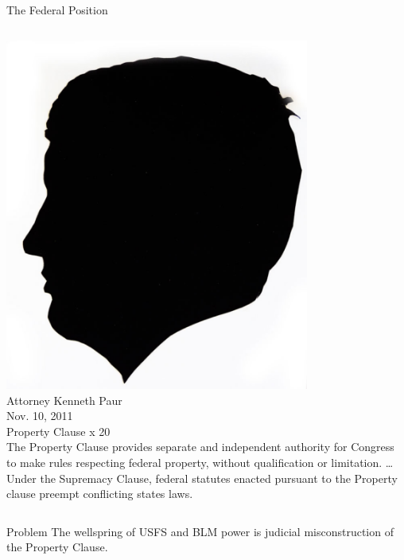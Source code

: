\begin{frame}{The Federal Position}
    \begin{columns}[c]
            \centering
            \includegraphics[width=0.75\textwidth]{img/elmer-dickens.png} \\
            Attorney Kenneth Paur \\
            Nov. 10, 2011 \\
            Property Clause x 20 \\
            The Property Clause provides separate and independent authority for
            Congress to make rules respecting federal property, without
            qualification or limitation. \ldots  Under the Supremacy Clause,
            federal statutes enacted pursuant to the Property clause preempt
            conflicting states laws.
    \end{columns}
\end{frame}

\begin{frame}
    \begin{varblock}[.8\textwidth]{Problem}
        The wellspring of USFS and BLM power is judicial misconstruction of the Property Clause.
    \end{varblock}
\end{frame}

